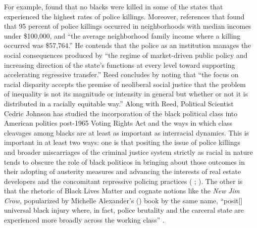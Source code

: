 \documentclass[12pt]{article}
\begin{document}
For example, \textcite{reedHowRacialDisparity2016} found that no blacks were killed in some of the states that experienced the highest rates of police killings. Moreover, \textcite{reedHowRacialDisparity2016} references that \textcite{jilani95PoliceKillings2015} found that 95 percent of police killings occurred in neighborhoods with median incomes under \$100,000, and “the average neighborhood family income where a killing occurred was \$57,764.” He contends that the police as an institution manages the social consequences produced by “the regime of market-driven public policy and increasing direction of the state’s functions at every level toward supporting accelerating regressive transfer.” Reed concludes by noting that “the focus on racial disparity accepts the premise of neoliberal social justice that the problem of inequality is not its magnitude or intensity in general but whether or not it is distributed in a racially equitable way.” Along with Reed, Political Scientist Cedric Johnson has studied the incorporation of the black political class into American politics post-1965 Voting Rights Act and the ways in which class cleavages among blacks are at least as important as interracial dynamics. This is important in at least two ways: one is that positing the issue of police killings and broader miscarriages of the criminal justice system strictly as racial in nature tends to obscure the role of black politicos in bringing about those outcomes in their adopting of austerity measures and advancing the interests of real estate developers and the concomitant repressive policing practices (\citeauthor{johnsonAfterwordBaltimorePolicing2016} \citeyear[305]{johnsonAfterwordBaltimorePolicing2016}; \citeyear[179]{johnsonTrumpismPolicingProblem2019}). The other is that the rhetoric of Black Lives Matter and cognate notions like the \textit{New Jim Crow}, popularized by Michelle Alexander’s (\citeyear{alexanderNewJimCrow2010}) book by the same name, “posit[] universal black injury where, in fact, police brutality and the carceral state are experienced more broadly across the working class” \parencite*[317]{johnsonAfterwordBaltimorePolicing2016}.

\end{document}
